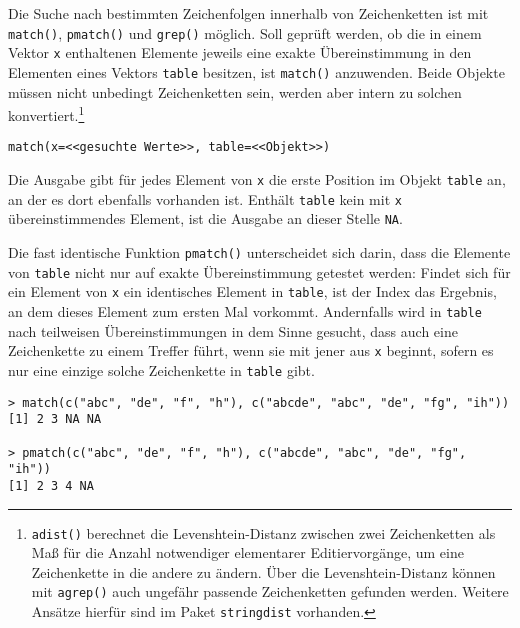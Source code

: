 Die Suche nach bestimmten Zeichenfolgen innerhalb von Zeichenketten ist mit \lstinline!match()!, \lstinline!pmatch()! und \lstinline!grep()! möglich. Soll geprüft werden, ob die in einem Vektor \lstinline!x! enthaltenen Elemente jeweils eine exakte Übereinstimmung in den Elementen eines Vektors \lstinline!table! besitzen, ist \lstinline!match()! anzuwenden. Beide Objekte müssen nicht unbedingt Zeichenketten sein, werden aber intern zu solchen konvertiert.\footnote{\label{ftn:adist}\lstinline!adist()! berechnet die Levenshtein-Distanz zwischen zwei Zeichenketten als Maß für die Anzahl notwendiger elementarer Editiervorgänge, um eine Zeichenkette in die andere zu ändern. Über die Levenshtein-Distanz können mit \lstinline!agrep()! auch ungefähr passende Zeichenketten gefunden werden. Weitere Ansätze hierfür sind im Paket \lstinline!stringdist! \cite{vanderLoo2014} vorhanden.}
\begin{lstlisting}
match(x=<<gesuchte Werte>>, table=<<Objekt>>)
\end{lstlisting}

Die Ausgabe gibt für jedes Element von \lstinline!x! die erste Position im Objekt \lstinline!table! an, an der es dort ebenfalls vorhanden ist. Enthält \lstinline!table! kein mit \lstinline!x! übereinstimmendes Element, ist die Ausgabe an dieser Stelle \lstinline!NA!\@.

Die fast identische Funktion \lstinline!pmatch()! unterscheidet sich darin, dass die Elemente von \lstinline!table! nicht nur auf exakte Übereinstimmung getestet werden: Findet sich für ein Element von \lstinline!x! ein identisches Element in \lstinline!table!, ist der Index das Ergebnis, an dem dieses Element zum ersten Mal vorkommt. Andernfalls wird in \lstinline!table! nach teilweisen Übereinstimmungen in dem Sinne gesucht, dass auch eine Zeichenkette zu einem Treffer führt, wenn sie mit jener aus \lstinline!x! beginnt, sofern es nur eine einzige solche Zeichenkette in \lstinline!table! gibt.
\begin{lstlisting}
> match(c("abc", "de", "f", "h"), c("abcde", "abc", "de", "fg", "ih"))
[1] 2 3 NA NA

> pmatch(c("abc", "de", "f", "h"), c("abcde", "abc", "de", "fg", "ih"))
[1] 2 3 4 NA
\end{lstlisting}

